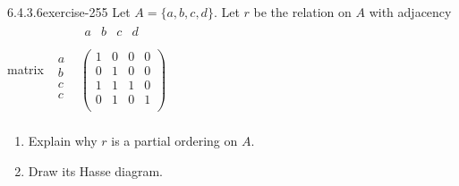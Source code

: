 \documentclass[twoside,10pt,]{book}
\numberwithin{equation}{section}
\begin{document}
\begin{divisionsolution}{6.4.3.6}{}{exercise-255}%
\hypertarget{p-2160}{}%
Let \(A = \{a, b, c, d\}\).  Let \(r\) be the relation on \(A\) with adjacency matrix \(\begin{array}{cc}
& 
\begin{array}{cccc}
a & b & c & d \\
\end{array}
\\
\begin{array}{c}
a \\
b \\
c \\
c \\
\end{array}
& \left(
\begin{array}{cccc}
1 & 0 & 0 & 0 \\
0 & 1 & 0 & 0 \\
1 & 1 & 1 & 0 \\
0 & 1 & 0 & 1 \\
\end{array}
\right) \\
\end{array}\)%
\par
\hypertarget{p-2161}{}%
\leavevmode%
\begin{enumerate}[label=(\alph*)]
\item\hypertarget{li-1141}{}\hypertarget{p-2162}{}%
Explain why \(r\) is a partial ordering on \(A\).%
\item\hypertarget{li-1142}{}\hypertarget{p-2163}{}%
Draw its Hasse diagram.%
\end{enumerate}
%
\end{divisionsolution}%
\end{document}
